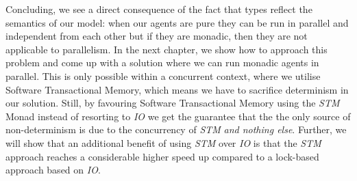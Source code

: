 Concluding, we see a direct consequence of the fact that types reflect the semantics of our model: when our agents are pure they can be run in parallel and independent from each other but if they are monadic, then they are not applicable to parallelism. In the next chapter, we show how to approach this problem and come up with a solution where we can run monadic agents in parallel. This is only possible within a concurrent context, where we utilise Software Transactional Memory, which means we have to sacrifice determinism in our solution. Still, by favouring Software Transactional Memory using the \textit{STM} Monad instead of resorting to \textit{IO} we get the guarantee that the the only source of non-determinism is due to the concurrency of \textit{STM} \textit{and nothing else}. Further, we will show that an additional benefit of using \textit{STM} over \textit{IO} is that the \textit{STM} approach reaches a considerable higher speed up compared to a lock-based approach based on \textit{IO}. 